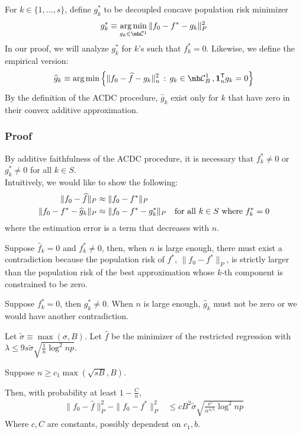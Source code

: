 For $k \in \{1,...,s\}$, define $g^*_k$ to be decoupled concave population risk minimizer
\[
g^*_k \equiv \argmin_{g_k \in \mh \mathcal{C}^1} \| f_0 - f^* - g_k \|_P^2 
\]
In our proof, we will analyze $g^*_k$ for $k$'s such that $f^*_k = 0$. Likewise, we define the empirical version:
\[
\hat{g}_k \equiv \argmin \Big\{ \| f_0 - \hat{f} - g_k \|_n^2 \,:\, g_k \in \mh \mathcal{C}^1_B \,, \mathbf{1}_n^\tran g_k = 0 \Big\}
\]
By the definition of the ACDC procedure, $\hat{g}_k$ exist only for $k$ that have zero in their convex additive approximation.


\subsubsection{Proof}
 
By additive faithfulness of the ACDC procedure, it is necessary that $f^*_k \neq 0$ or $g^*_k \neq 0$ for all $k \in S$. \\


Intuitively, we would like to show the following:
\begin{align*}
\| f_0 - \widehat{f} \|_P & \approx \| f_0 - f^* \|_P \\
\| f_0 - f^* - \widehat{g}_k \|_P & \approx \| f_0 - f^* - g^*_k \|_P 
       \quad \textrm{for all $k \in S$ where $f^*_k = 0$}
\end{align*}
where the estimation error is a term that decreases with $n$.

Suppose $\hat{f}_k = 0$ and $f^*_k \neq 0$, then, when $n$ is large enough, there must exist a contradiction because the population risk of $f^*$, $\| f_0 - f^* \|_P$, is strictly larger than the population risk of the best approximation whose $k$-th component is constrained to be zero. 

Suppose $f^*_k = 0$, then $g^*_k \neq 0$. When $n$ is large enough, $\hat{g}_k$ must not be zero or we would have another contradiction. \\


\begin{theorem}
\label{thm:convex_consistent}
Let $\tilde{\sigma} \equiv \max(\sigma, B)$. Let $\hat{f}$ be the minimizer of the restricted regression with $\lambda \leq 9 s \tilde{\sigma} \sqrt{ \frac{1}{n} \log^2 np}$.

Suppose $n \geq c_1 \max(\sqrt{sB}, B)$.

Then, with probability at least $1-\frac{C}{n}$,
\begin{align}
\|f_0 - \hat{f} \|_P^2 - \| f_0 - f^* \|_P^2 
&\leq c B^2 \tilde{\sigma} \sqrt{ \frac{s^5}{n^{4/5}} \log^2 np}
\end{align}
Where $c, C$ are constants, possibly dependent on $c_1, b$.

\end{theorem}


